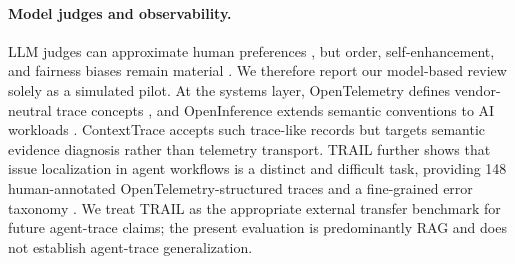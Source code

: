 \paragraph{Model judges and observability.}
LLM judges can approximate human preferences \citep{zheng2023judge}, but order,
self-enhancement, and fairness biases remain material \citep{wang2024fair}. We
therefore report our model-based review solely as a simulated pilot. At the
systems layer, OpenTelemetry defines vendor-neutral trace concepts
\citep{opentelemetry2026}, and OpenInference extends semantic conventions to AI
workloads \citep{openinference2026}. ContextTrace accepts such trace-like
records but targets semantic evidence diagnosis rather than telemetry transport.
TRAIL further shows that issue localization in agent workflows is a distinct
and difficult task, providing 148 human-annotated OpenTelemetry-structured
traces and a fine-grained error taxonomy \citep{deshpande2025trail}. We treat
TRAIL as the appropriate external transfer benchmark for future agent-trace
claims; the present evaluation is predominantly RAG and does not establish
agent-trace generalization.

